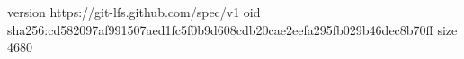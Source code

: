 version https://git-lfs.github.com/spec/v1
oid sha256:cd582097af991507aed1fc5f0b9d608cdb20cae2eefa295fb029b46dec8b70ff
size 4680
